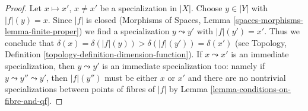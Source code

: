 \documentclass{stacks-project}
\theoremstyle{plain}
\theoremstyle{definition}
\theoremstyle{remark}
\numberwithin{equation}{subsection}
\begin{document}
\begin{proof}
Let $x \mapsto x'$, $x \not = x'$ be a specialization in $|X|$.
Choose $y \in |Y|$ with $|f|(y) = x$. Since $|f|$ is closed
(Morphisms of Spaces, Lemma \ref{spaces-morphisms-lemma-finite-proper})
we find a specialization $y \leadsto y'$ with $|f|(y') = x'$.
Thus we conclude that
$\delta(x) = \delta(|f|(y)) > \delta(|f|(y')) = \delta(x')$
(see Topology, Definition \ref{topology-definition-dimension-function}).
If $x \leadsto x'$ is an immediate specialization, then
$y \leadsto y'$ is an immediate specialization too:
namely if $y \leadsto y'' \leadsto y'$, then $|f|(y'')$
must be either $x$ or $x'$ and there are no nontrivial
specializations between points of fibres of $|f|$ by
Lemma \ref{lemma-conditions-on-fibre-and-qf}.
\end{proof}
\end{document}
